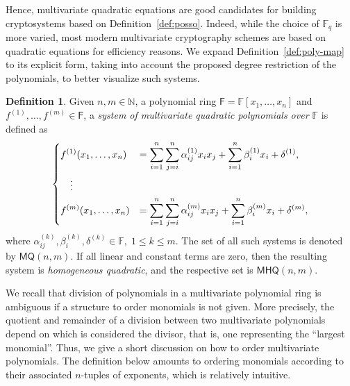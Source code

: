 \documentclass[12pt, a4paper, oneside]{memoir}
\theoremstyle{definition}
\newtheorem{definition}[theorem]{Definition}
\begin{document}
Hence, multivariate quadratic equations are good candidates for building cryptosystems based on Definition~\ref{def:posso}. Indeed, while the choice of $\mathbb{F}_{q}$ is more varied, most modern multivariate cryptography schemes are based on quadratic equations for efficiency reasons. We expand Definition~\ref{def:poly-map} to its explicit form, taking into account the proposed degree restriction of the polynomials, to better visualize such systems.

\begin{definition}\label{def:quad-poly-sys}
  Given $n, m \in \mathbb{N}$, a polynomial ring $\mathsf{F} = \mathbb{F}[x_{1}, \dots, x_{n}]$ and $f^{(1)}, \dots, f^{(m)} \in \mathsf{F}$, a \emph{system of multivariate quadratic polynomials over $\mathbb{F}$} is defined as
  \begin{align}
    \begin{split}
      \begin{dcases}
        f^{(1)}(x_{1}, \dots, x_{n}) &=
          \sum_{i = 1}^{n} \sum_{j = i}^{n} \alpha_{ij}^{(1)} x_{i} x_{j}
            + \sum_{i = 1}^{n} \beta_{i}^{(1)} x_{i} + \delta^{(1)}, \\
        \quad \vdots \\
        f^{(m)}(x_{1}, \dots, x_{n}) &=
          \sum_{i = 1}^{n} \sum_{j = i}^{n} \alpha_{ij}^{(m)} x_{i} x_{j}
            + \sum_{i = 1}^{n} \beta_{i}^{(m)} x_{i} + \delta^{(m)},
      \end{dcases}
    \end{split}
  \end{align}
  where $\alpha_{ij}^{(k)}, \beta_{i}^{(k)}, \delta^{(k)} \in \mathbb{F},\; 1 \leq k \leq m$. The set of all such systems is denoted by $\mathsf{MQ}(n, m)$. If all linear and constant terms are zero, then the resulting system is \emph{homogeneous quadratic}, and the respective set is $\mathsf{MHQ}(n, m)$.
\end{definition}

We recall that division of polynomials in a multivariate polynomial ring is ambiguous if a structure to order monomials is not given. More precisely, the quotient and remainder of a division between two multivariate polynomials depend on which is considered the divisor, that is, one representing the ``largest monomial''. Thus, we give a short discussion on how to order multivariate polynomials. The definition below amounts to ordering monomials according to their associated $n$-tuples of exponents, which is relatively intuitive.
\end{document}
